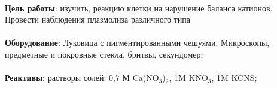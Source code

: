 




\begin{footnotesize}

\paragraph*{}\textbf{Цель работы}: изучить, реакцию клетки на нарушение баланса катионов. Провести наблюдения плазмолиза различного типа

\paragraph*{}\textbf{Оборудование}: Луковица с пигментированными чешуями. Микроскопы, предметные и покровные стекла, бритвы, секундомер;

\paragraph*{}\textbf{Реактивы}: растворы солей: 0,7 М Ca(NO${_3}$)$_2$, 1M KNO$_3$, 1M KCNS;

\end{footnotesize}


